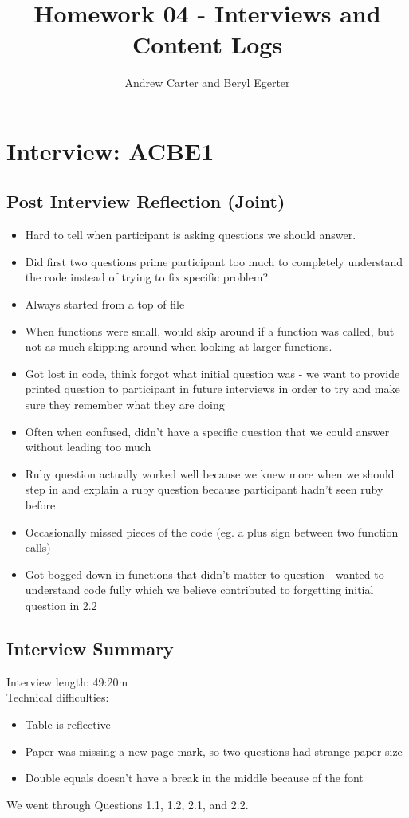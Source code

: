 \documentclass{article}
\title{Homework 04 - Interviews and Content Logs}
\author{Andrew Carter and Beryl Egerter}
\begin{document}
\maketitle
\section{Interview: ACBE1}
\subsection{Post Interview Reflection (Joint)}
\begin{itemize}
  \item Hard to tell when participant is asking questions we should answer.
  \item Did first two questions prime participant too much to completely understand the code instead of trying to fix specific problem?
  \item Always started from a top of file
  \item When functions were small, would skip around if a function was called, but not as much skipping around when looking at larger functions.
  \item Got lost in code, think forgot what initial question was - we want to provide printed question to participant in future interviews in order to try and make sure they remember what they are doing
  \item Often when confused, didn't have a specific question that we could answer without leading too much
  \item Ruby question actually worked well because we knew more when we should step in and explain a ruby question because participant hadn't seen ruby before
  \item Occasionally missed pieces of the code (eg. a plus sign between two function calls)
  \item Got bogged down in functions that didn't matter to question - wanted to understand code fully which we believe contributed to forgetting initial question in 2.2
\end{itemize}
\subsection{Interview Summary}
Interview length: 49:20m \\
Technical difficulties: 
\begin{itemize}
  \item Table is reflective
  \item Paper was missing a new page mark, so two questions had strange paper size
  \item Double equals doesn't have a break in the middle because of the font
\end{itemize}
We went through Questions 1.1, 1.2, 2.1, and 2.2. 
\end{document}
